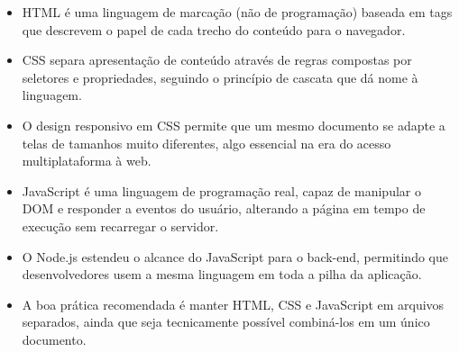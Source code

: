 \begin{itemize}
  \item HTML é uma linguagem de marcação (não de programação) baseada em tags que descrevem o papel de cada trecho do conteúdo para o navegador.
\end{itemize}

\begin{itemize}
  \item CSS separa apresentação de conteúdo através de regras compostas por seletores e propriedades, seguindo o princípio de cascata que dá nome à linguagem.
\end{itemize}

\begin{itemize}
  \item O design responsivo em CSS permite que um mesmo documento se adapte a telas de tamanhos muito diferentes, algo essencial na era do acesso multiplataforma à web.
\end{itemize}

\begin{itemize}
  \item JavaScript é uma linguagem de programação real, capaz de manipular o DOM e responder a eventos do usuário, alterando a página em tempo de execução sem recarregar o servidor.
\end{itemize}

\begin{itemize}
  \item O Node.js estendeu o alcance do JavaScript para o back-end, permitindo que desenvolvedores usem a mesma linguagem em toda a pilha da aplicação.
\end{itemize}

\begin{itemize}
  \item A boa prática recomendada é manter HTML, CSS e JavaScript em arquivos separados, ainda que seja tecnicamente possível combiná-los em um único documento.
\end{itemize}
